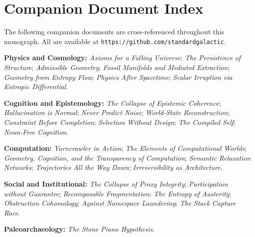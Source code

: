 \chapter{Companion Document Index}
\label{app:companion_index}

\noindent The following companion documents are cross-referenced throughout
this monograph. All are available at
\texttt{https://github.com/standardgalactic}.

\medskip
\noindent\textbf{Physics and Cosmology:} \emph{Axioms for a Falling Universe};
\emph{The Persistence of Structure}; \emph{Admissible Geometry};
\emph{Fossil Manifolds and Mediated Extraction}; \emph{Geometry from Entropy Flow};
\emph{Physics After Spacetime}; \emph{Scalar Irruption via Entropic Differential}.

\medskip
\noindent\textbf{Cognition and Epistemology:} \emph{The Collapse of Epistemic Coherence};
\emph{Hallucination is Normal}; \emph{Never Predict Noise}; \emph{World-State Reconstruction};
\emph{Constraint Before Completion}; \emph{Selection Without Design};
\emph{The Compiled Self}; \emph{Noun-Free Cognition}.

\medskip
\noindent\textbf{Computation:} \emph{Yarncrawler in Action};
\emph{The Elements of Computational Worlds}; \emph{Geometry, Cognition, and the
Transparency of Computation}; \emph{Semantic Relaxation Networks};
\emph{Trajectories All the Way Down}; \emph{Irreversibility as Architecture}.

\medskip
\noindent\textbf{Social and Institutional:} \emph{The Collapse of Proxy Integrity};
\emph{Participation without Guarantee}; \emph{Recomposable Fragmentation};
\emph{The Entropy of Austerity}; \emph{Obstruction Cohomology};
\emph{Against Namespace Laundering}; \emph{The Stack Capture Race}.

\medskip
\noindent\textbf{Paleoarchaeology:} \emph{The Stone Piano Hypothesis}.
